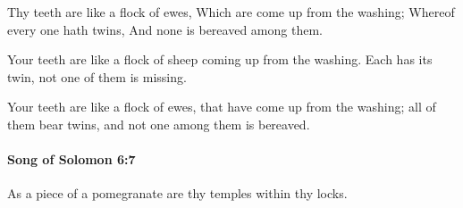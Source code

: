 			\begin{versebox}
					\item[BHS] 
					\item[LXX] 
					\item[ASV] Thy teeth are like a flock of ewes, Which are come up from the washing; Whereof every one hath twins, And none is bereaved among them.
					\item[NIV] Your teeth are like a flock of sheep coming up from the washing. Each has its twin, not one of them is missing.
					\item[NRSV] Your teeth are like a flock of ewes, that have come up from the washing; all of them bear twins, and not one among them is bereaved.
			\end{versebox}

		\paragraph{Song of Solomon 6:7} %
			\label{SONGOFSOLOMON-6-7}

			As a piece of a pomegranate are thy temples within thy locks.

